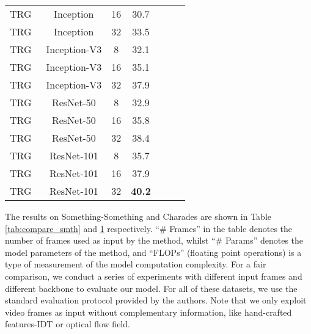 \documentclass[conference,compsoc]{IEEEtran}
\begin{document}
\begin{table}[!htb]
\begin{center}
\begin{tabular}{lcccccc}
         TRG~ & Inception & 16 & 30.7  \\
         TRG~ & Inception & 32 &  33.5  \\
         TRG~ & Inception-V3 & 8 & 32.1  \\
         TRG~ & Inception-V3 & 16 &  35.1 \\
         TRG~ & Inception-V3 & 32 & 37.9 \\
         TRG~ & ResNet-50 & 8 & 32.9 \\
         TRG~ & ResNet-50 & 16 & 35.8 \\
         TRG~ & ResNet-50 & 32 & 38.4 \\
         TRG~ & ResNet-101 & 8 & 35.7 \\
         TRG~ & ResNet-101 & 16 & 37.9 \\
         TRG~ & ResNet-101 & 32 & \textbf{40.2} \\
         \bottomrule
        \end{tabular}
        \end{center}
        \vspace{-3mm}
        \label{tab:compare_cha}
    \end{table}

    The results on Something-Something \cite{goyal2017something} and Charades \cite{actorobserver, sigurdsson2016hollywood} are shown in Table \ref{tab:compare_smth} and \ref{tab:compare_cha} respectively. ``\# Frames'' in the table denotes the number of frames used as input by the method, whilst ``\# Params'' denotes the model parameters of the method, and ``FLOPs'' (floating point operations) is a type of measurement of the model computation complexity. For a fair comparison, we conduct a series of experiments with different input frames and different backbone to evaluate our model. For all of these datasets, we use the standard evaluation protocol provided by the authors. Note that we only exploit video frames as input without complementary information, like hand-crafted features-IDT \cite{wang2013action} or optical flow field.
    
\end{document}
